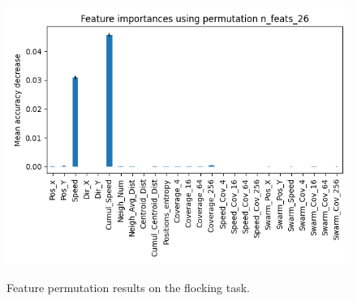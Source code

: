 \documentclass[../../Thesis.tex]{subfiles}
\begin{document}
\begin{figure}
{							\includegraphics[scale=0.31]{../../Images/Experiments/flocking_images/Feature_importances_using_permutation_n_feats_26.png}
					}
					\caption{Feature permutation results on the flocking task.}
					\label{fig:flocking_feature_permutation}
				\end{figure}
\end{document}
